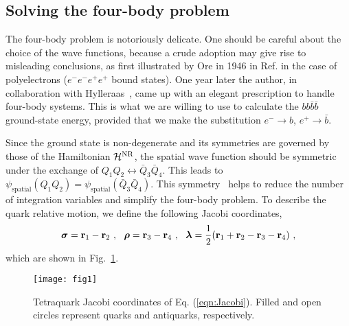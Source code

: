\documentclass[twocolumn,showpacs,superscriptaddress,preprintnumbers,nofootinbib,prd]{revtex4-1}
\def\be{\begin{equation}}
\def\ee{\end{equation}}
\begin{document}
\subsection{Solving the four-body problem}

The four-body problem is notoriously delicate. One should be careful about the
choice of the wave functions, because a crude adoption may give rise to
misleading conclusions, as first illustrated by Ore in 1946 in Ref.
\cite{Ore:1946zz} in the case of polyelectrons ($e^- e^- e^+ e^+$ bound states).
One year later the author, in collaboration with
Hylleraas~\cite{Hylleraas:1947zza}, came up with an elegant prescription to
handle four-body systems.
This is what we are willing to use to calculate the $bb \bar b \bar b$
ground-state energy, provided that we make the substitution $e^- \rightarrow b$,
$e^+ \rightarrow \bar b$.

Since the ground state is non-degenerate and its symmetries are governed by
those of the Hamiltonian $\mathcal H^{\rm NR}$, the spatial wave function should
be symmetric under the exchange of $Q_1Q_2\leftrightarrow \bar{Q}_3 \bar{Q}_4$.
This leads to $\psi_{\textrm{spatial}}(Q_1Q_2)=\psi_{\textrm{spatial}}(\bar{Q}_3
\bar{Q}_4)$. This symmetry~\cite{Hylleraas:1947zza} helps to reduce the
number of integration variables and simplify the four-body problem.
To describe the quark relative motion, we define the following Jacobi
coordinates,
\be
\label{eqn:Jacobi}
{\bm\sigma} = {\bf r}_1 - {\bf r}_2 ~, ~~ {\bm\rho} = {\bf r}_3 - {\bf r}_4 ~, ~~ {\bm \lambda} = \frac{1}{2} ({\bf r}_1 + {\bf r}_2 - {\bf r}_3 - {\bf r}_4) ~,
\ee
which are shown in Fig.~\ref{config}.
\begin{figure}[h]
\begin{center}
\texttt{[image: fig1]}
\end{center}
\caption{Tetraquark Jacobi coordinates of Eq. (\ref{eqn:Jacobi}). Filled and
open circles represent quarks and antiquarks, respectively.}
\label{config}
\end{figure}
\end{document}
